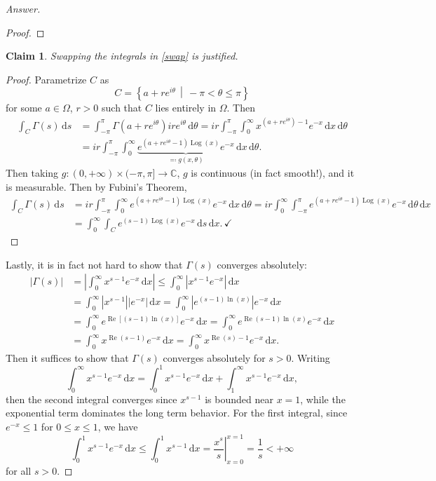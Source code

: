 \documentclass[12pt]{article}
\newcommand{\cx}{\mathbb{C}}
\newcommand\paren[1]{\left( #1 \right)}
\newcommand\setb[1]{\left \{ #1 \right \}}
\newcommand{\sqbrack}[1]{\left [ #1 \right ]}
\newcommand{\abs}[1]{\left| #1 \right|}
\renewcommand{\i}[4]{\int_{#1}^{#2} {#3} \, \mathrm{d} {#4} }
\newtheorem*{claim}{Claim}
\theoremstyle{definition}
\DeclareMathOperator\Log{Log}
\DeclareMathOperator\re{Re}
\begin{document}
\begin{proof}[Answer]
\begin{proof}
    \end{proof}
    \begin{claim}
        Swapping the integrals in \eqref{swap} is justified. 
    \end{claim}
    \begin{proof}
        Parametrize $C$ as 
        \[
            C = \setb{ a + re^{i\theta} \, \middle| \, -\pi < \theta \leq \pi }
        \]
        for some $a \in \Omega$, $r > 0$ such that $C$ lies entirely in $\Omega$. Then 
        \begin{align*}
            \i{C}{}{\Gamma(s)}{s} & = \i{-\pi}{\pi}{\Gamma \paren{ a + re^{i\theta} } i re^{i\theta}}{\theta} = ir \i{-\pi}{\pi}{ \i{0}{\infty}{ x^{ \paren{ a + re^{i\theta} } - 1} e^{-x} }{x} }{\theta} \\ 
            & = ir \i{-\pi}{\pi}{ \i{0}{\infty}{ \underbrace{ e^{ \paren{ a + re^{i\theta}  - 1} \Log(x) } e^{-x} }_{ \eqqcolon g(x,\theta) } }{x} }{\theta} . 
        \end{align*}
        Then taking $g : (0,+\infty) \times (-\pi,\pi] \to \cx$, $g$ is continuous (in fact smooth!), and it is measurable. Then by Fubini's Theorem, 
        \begin{align*}
            \i{C}{}{\Gamma(s)}{s} & = ir \i{-\pi}{\pi}{ \i{0}{\infty}{ e^{ \paren{ a + re^{i\theta}  - 1} \Log(x) } e^{-x} }{x} }{\theta} = ir \i{0}{\infty}{ \i{-\pi}{\pi}{ e^{ \paren{ a + re^{i\theta}  - 1} \Log(x) } e^{-x} }{\theta} }{x} \\ 
            & = \i{0}{\infty}{ \i{C}{}{e^{(s-1)\Log(x)}e^{-x}}{s} }{x} . \, \checkmark 
        \end{align*}
    \end{proof}
    Lastly, it is in fact not hard to show that $\Gamma(s)$ converges absolutely: 
    \begin{align*}
        \abs{ \Gamma(s) } & = \abs{ \i{0}{\infty}{x^{s-1}e^{-x}}{x} } \leq \i{0}{\infty}{\abs{ x^{s-1} e^{-x} }}{x} \\ 
        & = \i{0}{\infty}{ \abs{ x^{s-1} } \abs{ e^{-x} } }{x} = \i{0}{\infty}{ \abs{ e^{(s-1)\ln(x)} } e^{-x} }{x} \\ 
        & = \i{0}{\infty}{ e^{ \re \sqbrack{ (s - 1) \ln(x) } } e^{-x} }{x} = \i{0}{\infty}{ e^{ \re(s-1) \ln(x)  } e^{-x} }{x} \\ 
        & = \i{0}{\infty}{ x^{\re(s-1)} e^{-x} }{x} = \i{0}{\infty}{ x^{\re(s)-1} e^{-x} }{x} . 
    \end{align*}
    Then it suffices to show that $\Gamma(s)$ converges absolutely for $s > 0$. Writing
    \[
        \i{0}{\infty}{x^{s-1}e^{-x}}{x} = \i{0}{1}{x^{s-1}e^{-x}}{x} + \i{1}{\infty}{x^{s-1}e^{-x}}{x} , 
    \]
    then the second integral converges since $x^{s-1}$ is bounded near $x = 1$, while the exponential term dominates the long term behavior. For the first integral, since $e^{-x} \leq 1$ for $0 \leq x \leq 1$, we have 
    \[
        \i{0}{1}{x^{s-1}e^{-x}}{x} \leq \i{0}{1}{x^{s-1}}{x} = \left. \frac{x^s}{s} \right|_{x = 0}^{x = 1} = \frac{1}{s} < +\infty 
    \]
    for all $s > 0$. 
\end{proof}
\end{document}
